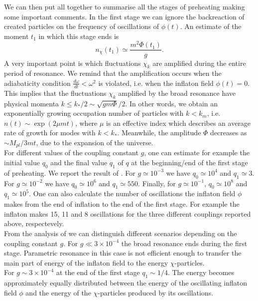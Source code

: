 \documentclass[11pt,a4paper,twoside]{book}
\begin{document}
 We can then put all together to summarise all the stages of preheating making some important comments.
In the first stage we can ignore the backreaction of created particles on the frequency of oscillations of $ \phi(t) $. An estimate of the moment $ t_{1} $ in which this stage ends is 
\begin{equation}
\label{Chap4:estimate}
n_{\chi}(t_{1}) \simeq \frac{m^{2}\Phi(t_{1})}{g}.
\end{equation}
A very important point is which fluctuations $\chi_{k}$ are amplified during the entire period of resonance. We remind that the amplification occurs when the adiabaticity condition $ \frac{d\omega}{dt} < \omega^{2} $ is violated, i.e. when the inflaton field $ \phi(t)=0 $. This implies that the  fluctuations $\chi_{k}$ amplified by the broad resonance have physical momenta $ k \le k_{*}/2 \sim  \sqrt{gm\Phi}/2 $. In other words, we  obtain an exponentially growing occupation number of particles with $ k < k_{m} $, i.e. $ n(t) \sim \exp(2\mu m t) $, where $\mu$ is an effective index which describes an average rate of growth for modes with $ k<k_{*} $. Meanwhile, the amplitude $\Phi$ decreases as $\sim M_{pl}/3mt$, due to the expansion of the universe.\\
 For different values of the coupling constant $ g $, one can estimate for example the initial value $ q_{0} $ and the final value $ q_{1} $ of $ q $ at the  beginning/end of the first stage of preheating. We report the result of \cite{Chap4:LindePreheatingModel}. For $ g \simeq 10^{-3}$ we have $q_{0}\simeq 10^{4} $ and $ q_{1}\simeq 3 $. For $ g \simeq 10^{-2} $ we have $q_{0} \simeq 10^{6} $ and $ q_{1}\simeq 550 $. Finally, for $g\simeq 10^{-1} $, $ q_{0}\simeq 10^{8} $ and $ q_{1} \simeq 10^{5} $. One can also calculate the number of oscillations the inflaton field $ \phi $ makes from the end of inflation to the end of the first stage. For example the inflaton makes 15, 11 and 8 oscillations for the three different couplings reported above, respectevely.\\
 From the analysis of \cite{Chap4:LindePreheatingModel} we can distinguish different scenarios depending on the coupling constant $ g $. For $ g \ll 3 \times 10^{-4} $ the broad resonance ends during the first stage. Parametric resonance in this case is not efficient enough to transfer the main part of energy of the inflaton field to the energy $\chi$-particles. \\
 For $ g\sim 3 \times 10^{-4} $ at the end of the first stage $ q_{1} \sim 1/4 $. The energy becomes approximately equally distributed between the energy of the oscillating inflaton field $\phi$ and the energy of the $\chi$-particles produced by its oscillations.\\
\end{document}
